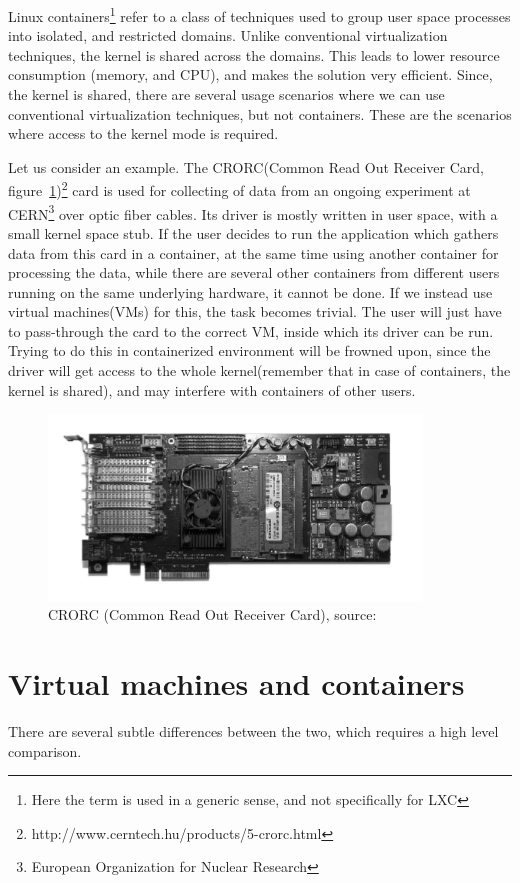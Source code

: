 \documentclass[twoside]{iitbreport}
\begin{document}
Linux containers\footnote{Here the term is used in a generic sense, and not specifically for LXC} refer to a class of techniques used to group user space processes into isolated, and restricted domains. Unlike conventional virtualization techniques, the kernel is shared across the domains. This leads to lower resource consumption (memory, and CPU), and makes the solution very efficient. Since, the kernel is shared, there are several usage scenarios where we can use conventional virtualization techniques, but not containers. These are the scenarios where access to the kernel mode is required.

Let us consider an example. The CRORC(Common Read Out Receiver Card, figure~\ref{fig:crorc_card1})\footnote{http://www.cerntech.hu/products/5-crorc.html} card is used for collecting of data from an ongoing experiment at CERN\footnote{European Organization for Nuclear Research} over optic fiber cables. Its driver is mostly written in user space, with a small kernel space stub. If the user decides to run the application which gathers data from this card in a container, at the same time using another container for processing the data, while there are several other containers from different users running on the same underlying hardware, it cannot be done. If we instead use virtual machines(VMs) for this, the task becomes trivial. The user will just have to pass-through the card to the correct VM, inside which its driver can be run. Trying to do this in containerized  environment will be frowned upon, since the driver will get access to the whole kernel(remember that in case of containers, the kernel is shared), and may interfere with containers of other users.

\begin{figure}[ht]
\centering
\includegraphics[width=375px]{crorc-card}
\caption{CRORC (Common Read Out Receiver Card), source:\cite{Eschweiler2014TheArchitecture} \label{fig:crorc_card1}}
\end{figure}


\section{Virtual machines and containers}
There are several subtle differences between the two, which requires a high level comparison.
\end{document}
